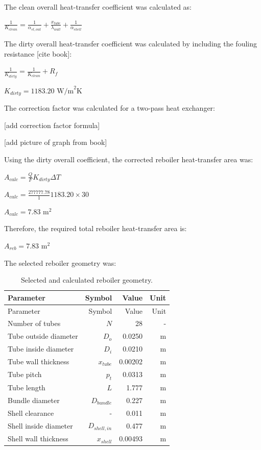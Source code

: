The clean overall heat-transfer coefficient was calculated as:

\(\frac{1}{K_{clean}} = \frac{1}{\alpha_{st,out}} + \frac{x_{tube}}{\lambda_{wall}} + \frac{1}{\alpha_{shell}}\)

The dirty overall heat-transfer coefficient was calculated by including
the fouling resistance {[}cite book{]}:

\(\frac{1}{K_{dirty}} = \frac{1}{K_{clean}} + R_f\)

\(K_{dirty} = 1183.20 \text{ W/m}^2\text{K}\)

The correction factor was calculated for a two-pass heat exchanger:

{[}add correction factor formula{]}

{[}add picture of graph from book{]}

Using the dirty overall coefficient, the corrected reboiler
heat-transfer area was:

\(A_{calc} = \frac{Q}{F}{K_{dirty} \Delta T}\)

\(A_{calc} = \frac{277777.78}{1}{1183.20 \times 30}\)

\(A_{calc} = 7.83 \text{ m}^2\)

Therefore, the required total reboiler heat-transfer area is:

\(A_{reb} = 7.83 \text{ m}^2\)

The selected reboiler geometry was:

\begin{longtable}[]{@{}lrrr@{}}
\caption{Selected and calculated reboiler geometry.
\label{tab:Selected and calculated reboiler geometry}}\tabularnewline
\toprule\noalign{}
Parameter & Symbol & Value & Unit \\
\midrule\noalign{}
\endfirsthead
\toprule\noalign{}
Parameter & Symbol & Value & Unit \\
\midrule\noalign{}
\endhead
\bottomrule\noalign{}
\endlastfoot
Number of tubes & \(N\) & 28 & - \\
Tube outside diameter & \(D_o\) & 0.0250 & m \\
Tube inside diameter & \(D_i\) & 0.0210 & m \\
Tube wall thickness & \(x_{tube}\) & 0.00202 & m \\
Tube pitch & \(p_t\) & 0.0313 & m \\
Tube length & \(L\) & 1.777 & m \\
Bundle diameter & \(D_{bundle}\) & 0.227 & m \\
Shell clearance & - & 0.011 & m \\
Shell inside diameter & \(D_{shell,in}\) & 0.477 & m \\
Shell wall thickness & \(x_{shell}\) & 0.00493 & m \\
\end{longtable}

